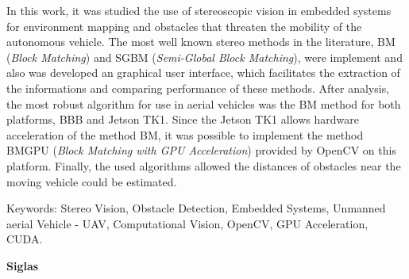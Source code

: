 In this work, it was studied the use of stereoscopic vision in embedded systems for environment mapping and obstacles that threaten the mobility of the autonomous vehicle. The most well known stereo methods in the literature, BM (\textit{Block Matching}) and SGBM (\textit{Semi-Global Block Matching}), were implement and also was developed an graphical user interface, which facilitates the extraction of the informations and comparing performance of these methods. After analysis, the most robust algorithm for use in aerial vehicles was the BM method for both platforms, BBB and Jetson TK1. Since the Jetson TK1 allows hardware acceleration of the method BM, it was possible to implement the method BMGPU (\textit{Block Matching with GPU Acceleration}) provided by OpenCV on this platform. Finally, the used algorithms allowed the distances of obstacles near the moving vehicle could be estimated.

\vspace{0.05\textheight}

Keywords: Stereo Vision, Obstacle Detection, Embedded Systems, Unmanned aerial Vehicle - UAV, Computational Vision, OpenCV, GPU Acceleration, CUDA.

\cleardoublepage

\listoffigures %

\listoftables %

\cleardoublepage

\vspace{0.11\textheight} 

\textbf{\Huge{Siglas}}

\vspace{0.05\textheight}

